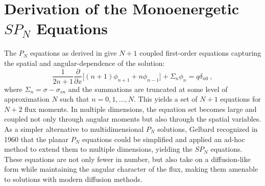 \section{Derivation of the Monoenergetic $SP_N$ Equations}
\label{sec:spn_equations}
The $P_N$ equations as derived in \cite{lewis_computational_1993}
give $N+1$ coupled first-order equations capturing the spatial and
angular-dependence of the solution:
\begin{equation}
   \frac{1}{2n+1} \frac{\partial}{\partial x}\Big[ (n+1) \phi_{n+1} + n
     \phi_{n-1} \Big] + \Sigma_n \phi_n = q\delta_{n0} \:,
  \label{eq:final_pn_equations}
\end{equation}
where $\Sigma_n = \sigma-\sigma_{sn}$ and the summations are truncated
at some level of approximation $N$ such that $n = 0,1,\dotsc,N$. This
yields a set of $N+1$ equations for $N+2$ flux moments. In multiple
dimensions, the equation set becomes large and coupled not only
through angular moments but also through the spatial variables. As a
simpler alternative to multidimensional $P_N$ solutions, Gelbard
recognized in 1960 that the planar $P_N$ equations could be simplified
and applied an ad-hoc method to extend them to multiple dimensions,
yielding the $SP_N$ equations. These equations are not only fewer in
number, but also take on a diffusion-like form while maintaining the
angular character of the flux, making them amenable to solutions with
modern diffusion methods.

